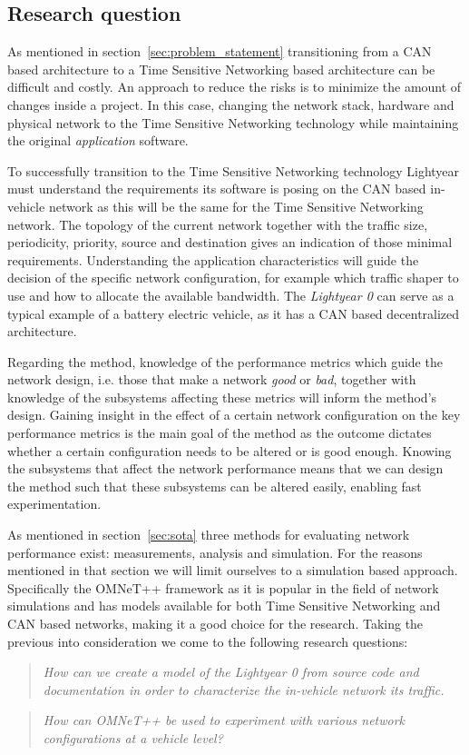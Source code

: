 \subsection{Research question}
\label{sec:research_question}
As mentioned in section~\ref{sec:problem_statement} transitioning from a CAN based architecture to a Time Sensitive Networking based architecture can be difficult and costly. An approach to reduce the risks is to minimize the amount of changes inside a project. In this case, changing the network stack, hardware and physical network to the Time Sensitive Networking technology while maintaining the original \textit{application} software.

To successfully transition to the Time Sensitive Networking technology Lightyear must understand the requirements its software is posing on the CAN based in-vehicle network as this will be the same for the Time Sensitive Networking network. The topology of the current network together with the traffic size, periodicity, priority, source and destination gives an indication of those minimal requirements. Understanding the application characteristics will guide the decision of the specific network configuration, for example which traffic shaper to use and how to allocate the available bandwidth. The \textit{Lightyear 0} can serve as a typical example of a battery electric vehicle, as it has a CAN based decentralized architecture.

Regarding the method, knowledge of the performance metrics which guide the network design, i.e. those that make a network \textit{good} or \textit{bad}, together with knowledge of the subsystems affecting these metrics will inform the method's design. Gaining insight in the effect of a certain network configuration on the key performance metrics is the main goal of the method as the outcome dictates whether a certain configuration needs to be altered or is good enough. Knowing the subsystems that affect the network performance means that we can design the method such that these subsystems can be altered easily, enabling fast experimentation.

As mentioned in section~\ref{sec:sota} three methods for evaluating network performance exist: measurements, analysis and simulation. For the reasons mentioned in that section we will limit ourselves to a simulation based approach. Specifically the OMNeT++ framework as it is popular in the field of network simulations and has models available for both Time Sensitive Networking and CAN based networks, making it a good choice for the research. Taking the previous into consideration we come to the following research questions:

\begin{quote}
    \emph{How can we create a model of the Lightyear 0 from source code and documentation in order to characterize the in-vehicle network its traffic.}
\end{quote}

\begin{quote}
    \emph{How can OMNeT++ be used to experiment with various network configurations at a vehicle level?}
\end{quote}